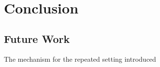\chapter{Conclusion}
\label{cha:conc}


\section{Future Work}
\label{sec:future}

The mechanism for the repeated setting introduced 

